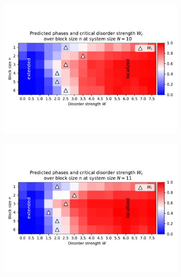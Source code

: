 \documentclass[reprint,amsmath,amssymb,aps,prb]{revtex4-2}
\begin{document}
\begin{center}
\begin{figure}[ht!]
		\begin{subfigure}[c]{0.4\textwidth}
			\includegraphics[width=\textwidth, trim={0 2cm 0 3cm},clip]{../results/Wc/N10_Wc_n_dependency.pdf}
		\end{subfigure}
		\begin{subfigure}[c]{0.4\textwidth}
			\includegraphics[width=\textwidth, trim={0 2cm 0 3cm},clip]{../results/Wc/N11_Wc_n_dependency.pdf}
		\end{subfigure}
		\begin{subfigure}[c]{0.4\textwidth}

\end{subfigure}
\end{figure}
\end{center}
\end{document}
